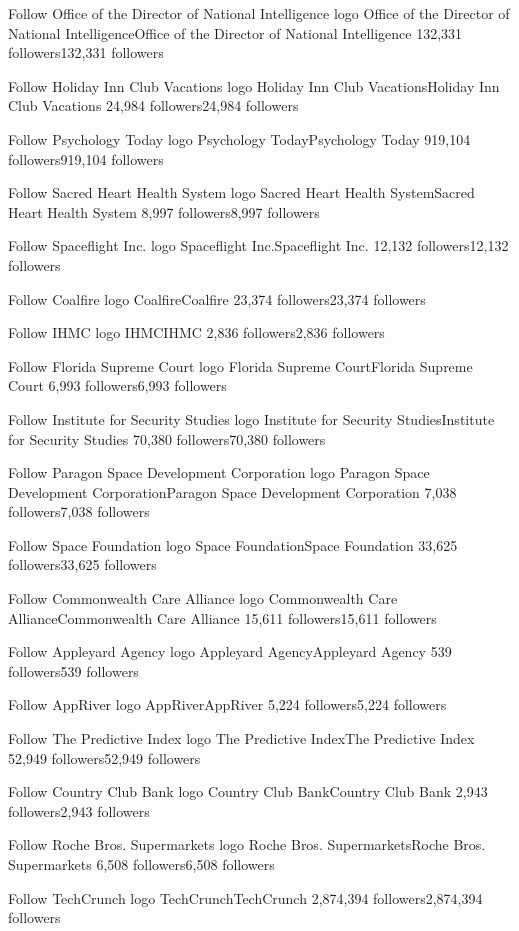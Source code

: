 Follow
Office of the Director of National Intelligence logo
Office of the Director of National IntelligenceOffice of the Director of National Intelligence
132,331 followers132,331 followers

Follow
Holiday Inn Club Vacations logo
Holiday Inn Club VacationsHoliday Inn Club Vacations
24,984 followers24,984 followers

Follow
Psychology Today logo
Psychology TodayPsychology Today
919,104 followers919,104 followers

Follow
Sacred Heart Health System logo
Sacred Heart Health SystemSacred Heart Health System
8,997 followers8,997 followers

Follow
Spaceflight Inc. logo
Spaceflight Inc.Spaceflight Inc.
12,132 followers12,132 followers

Follow
Coalfire logo
CoalfireCoalfire
23,374 followers23,374 followers

Follow
IHMC logo
IHMCIHMC
2,836 followers2,836 followers

Follow
Florida Supreme Court logo
Florida Supreme CourtFlorida Supreme Court
6,993 followers6,993 followers

Follow
Institute for Security Studies logo
Institute for Security StudiesInstitute for Security Studies
70,380 followers70,380 followers

Follow
Paragon Space Development Corporation logo
Paragon Space Development CorporationParagon Space Development Corporation
7,038 followers7,038 followers

Follow
Space Foundation logo
Space FoundationSpace Foundation
33,625 followers33,625 followers

Follow
Commonwealth Care Alliance logo
Commonwealth Care AllianceCommonwealth Care Alliance
15,611 followers15,611 followers

Follow
Appleyard Agency logo
Appleyard AgencyAppleyard Agency
539 followers539 followers

Follow
AppRiver logo
AppRiverAppRiver
5,224 followers5,224 followers

Follow
The Predictive Index logo
The Predictive IndexThe Predictive Index
52,949 followers52,949 followers

Follow
Country Club Bank logo
Country Club BankCountry Club Bank
2,943 followers2,943 followers

Follow
Roche Bros. Supermarkets logo
Roche Bros. SupermarketsRoche Bros. Supermarkets
6,508 followers6,508 followers

Follow
TechCrunch logo
TechCrunchTechCrunch
2,874,394 followers2,874,394 followers

